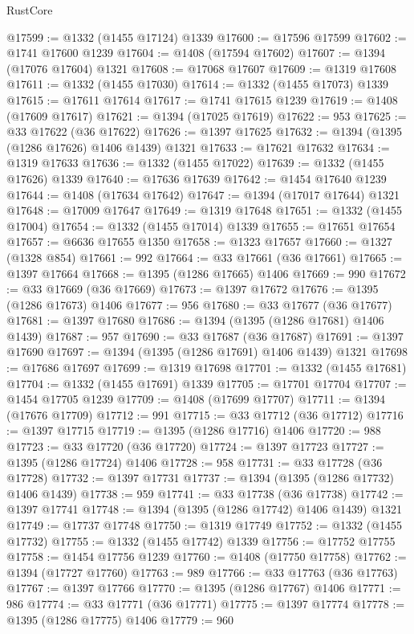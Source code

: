 \begin{lexlean}{RustCore}
\begin{coremodule}
@17599 := @1332 (@1455 @17124) @1339
@17600 := @17596 @17599
@17602 := @1741 @17600 @1239
@17604 := @1408 (@17594 @17602)
@17607 := @1394 (@17076 @17604) @1321
@17608 := @17068 @17607
@17609 := @1319 @17608
@17611 := @1332 (@1455 @17030)
@17614 := @1332 (@1455 @17073) @1339
@17615 := @17611 @17614
@17617 := @1741 @17615 @1239
@17619 := @1408 (@17609 @17617)
@17621 := @1394 (@17025 @17619)
@17622 := 953
@17625 := @33 @17622 (@36 @17622)
@17626 := @1397 @17625
@17632 := @1394 (@1395 (@1286 @17626) @1406 @1439) @1321
@17633 := @17621 @17632
@17634 := @1319 @17633
@17636 := @1332 (@1455 @17022)
@17639 := @1332 (@1455 @17626) @1339
@17640 := @17636 @17639
@17642 := @1454 @17640 @1239
@17644 := @1408 (@17634 @17642)
@17647 := @1394 (@17017 @17644) @1321
@17648 := @17009 @17647
@17649 := @1319 @17648
@17651 := @1332 (@1455 @17004)
@17654 := @1332 (@1455 @17014) @1339
@17655 := @17651 @17654
@17657 := @6636 @17655 @1350
@17658 := @1323 @17657
@17660 := @1327 (@1328 @854)
@17661 := 992
@17664 := @33 @17661 (@36 @17661)
@17665 := @1397 @17664
@17668 := @1395 (@1286 @17665) @1406
@17669 := 990
@17672 := @33 @17669 (@36 @17669)
@17673 := @1397 @17672
@17676 := @1395 (@1286 @17673) @1406
@17677 := 956
@17680 := @33 @17677 (@36 @17677)
@17681 := @1397 @17680
@17686 := @1394 (@1395 (@1286 @17681) @1406 @1439)
@17687 := 957
@17690 := @33 @17687 (@36 @17687)
@17691 := @1397 @17690
@17697 := @1394 (@1395 (@1286 @17691) @1406 @1439) @1321
@17698 := @17686 @17697
@17699 := @1319 @17698
@17701 := @1332 (@1455 @17681)
@17704 := @1332 (@1455 @17691) @1339
@17705 := @17701 @17704
@17707 := @1454 @17705 @1239
@17709 := @1408 (@17699 @17707)
@17711 := @1394 (@17676 @17709)
@17712 := 991
@17715 := @33 @17712 (@36 @17712)
@17716 := @1397 @17715
@17719 := @1395 (@1286 @17716) @1406
@17720 := 988
@17723 := @33 @17720 (@36 @17720)
@17724 := @1397 @17723
@17727 := @1395 (@1286 @17724) @1406
@17728 := 958
@17731 := @33 @17728 (@36 @17728)
@17732 := @1397 @17731
@17737 := @1394 (@1395 (@1286 @17732) @1406 @1439)
@17738 := 959
@17741 := @33 @17738 (@36 @17738)
@17742 := @1397 @17741
@17748 := @1394 (@1395 (@1286 @17742) @1406 @1439) @1321
@17749 := @17737 @17748
@17750 := @1319 @17749
@17752 := @1332 (@1455 @17732)
@17755 := @1332 (@1455 @17742) @1339
@17756 := @17752 @17755
@17758 := @1454 @17756 @1239
@17760 := @1408 (@17750 @17758)
@17762 := @1394 (@17727 @17760)
@17763 := 989
@17766 := @33 @17763 (@36 @17763)
@17767 := @1397 @17766
@17770 := @1395 (@1286 @17767) @1406
@17771 := 986
@17774 := @33 @17771 (@36 @17771)
@17775 := @1397 @17774
@17778 := @1395 (@1286 @17775) @1406
@17779 := 960

\end{coremodule}
\end{lexlean}
